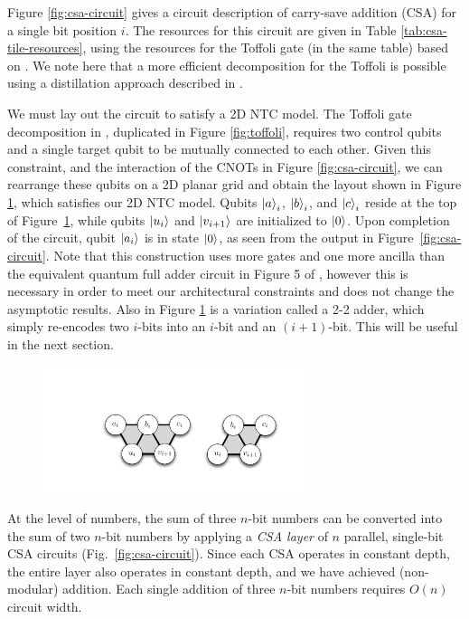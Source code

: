 Figure \ref{fig:csa-circuit} gives a circuit description of carry-save addition (CSA) for a single bit position $i$.
The resources for this circuit are given in Table \ref{tab:csa-tile-resources}, using
the resources for the Toffoli gate (in the same table) based on
\cite{Amy2012}. We note here
that a more efficient decomposition for the Toffoli is possible using a
distillation approach described in \cite{Jones2013a}.

We must lay out the circuit to satisfy a 2D NTC model.
The Toffoli gate decomposition in \cite{Amy2012}, duplicated in
Figure \ref{fig:toffoli}, requires two control
qubits and a single target qubit to be
mutually connected to each other. Given this constraint, and the
interaction of the CNOTs in Figure \ref{fig:csa-circuit}, we can
rearrange these qubits on a 2D planar grid and obtain the layout shown
in Figure \ref{fig:csa-3-2}, which satisfies our 2D NTC model.
Qubits $\left\vert{a}\right\rangle_i$, $\left\vert{b}\right\rangle_i$, and $\left\vert{c}\right\rangle_i$ reside at the top of Figure~\ref{fig:csa-3-2}, while qubits $\left\vert{u_i}\right\rangle$ and $\left\vert{v_{i+1}}\right\rangle$ are initialized to $\left\vert{0}\right\rangle$.
Upon completion of the circuit, qubit $\left\vert{a_i}\right\rangle$ is in state $\left\vert{0}\right\rangle$, as seen from the output in Figure~\ref{fig:csa-circuit}. 
Note that this construction uses more gates and one more ancilla than the equivalent
quantum full adder circuit in Figure 5 of \cite{Gossett1998}, however this
is necessary in order to meet our architectural constraints and does not change the
asymptotic results.
Also in Figure \ref{fig:csa-3-2}
is a variation called a 2-2 adder, which simply re-encodes two $i$-bits
into an $i$-bit and an $(i+1)$-bit. This will be useful in the next section.

\begin{figure}[b!]
\begin{center}
\includegraphics[width=3in]{figures/csa-32-22.pdf}
\end{center}
\label{fig:csa-3-2}
\end{figure}

At the level of numbers, the sum of three $n$-bit numbers can be converted into
the sum of two $n$-bit numbers by applying a \emph{CSA layer} of
$n$ parallel, single-bit
CSA circuits (Fig.~\ref{fig:csa-circuit}). Since each CSA operates in constant depth, the entire layer also
operates in constant depth, and we have achieved (non-modular) addition.
%
Each single addition of three $n$-bit numbers requires $O(n)$ circuit width.

